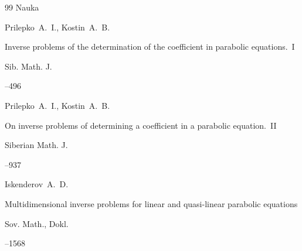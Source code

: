 \begin{thebibliography}{99}
\publ Nauka










\by Prilepko~A.~I., Kostin~A.~B.

\paper Inverse problems of the determination of the coefficient in parabolic equations.~I

\jour Sib. Math. J. 



--496 









\by Prilepko~A.~I., Kostin~A.~B.

\paper On inverse problems of determining a coefficient in a parabolic equation.~II

\jour Siberian Math. J.




--937






\by Iskenderov~A.~D.

\paper  Multidimensional inverse problems for linear and quasi-linear parabolic equations

\jour Sov. Math., Dokl.



--1568 











\end{thebibliography}
